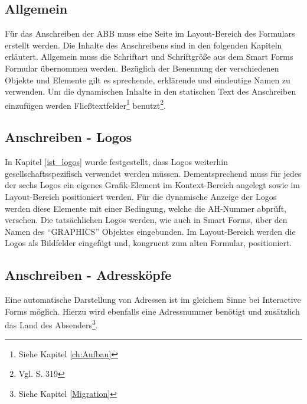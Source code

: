 \subsection{Allgemein}

Für das Anschreiben der ABB muss eine Seite im Layout-Bereich des Formulars erstellt werden. Die Inhalte des Anschreibens sind in den folgenden Kapiteln erläutert. Allgemein muss die Schriftart und Schriftgröße aus dem Smart Forms Formular übernommen werden. Bezüglich der Benennung der verschiedenen Objekte und Elemente gilt es sprechende, erklärende und eindeutige Namen zu verwenden. Um die dynamischen Inhalte in den statischen Text des Anschreiben einzufügen werden Fließtextfelder\footnote{Siehe Kapitel \ref{ch:Aufbau}} benutzt\footnote{Vgl. \cite{Hauser.2015} S. 319}.

\subsection{Anschreiben - Logos}

In Kapitel \ref{ist_logos} wurde festgestellt, dass Logos weiterhin gesellschaftsspezifisch verwendet werden müssen. Dementsprechend muss für jedes der sechs Logos ein eigenes Grafik-Element im Kontext-Bereich angelegt sowie im Layout-Bereich positioniert werden. Für die dynamische Anzeige der Logos werden diese Elemente mit einer Bedingung, welche die \ac{AH}-Nummer abprüft, versehen. Die tatsächlichen Logos werden, wie auch in Smart Forms, über den Namen des "`GRAPHICS"' Objektes eingebunden. Im Layout-Bereich werden die Logos als Bildfelder eingefügt und, kongruent zum alten Formular, positioniert. 

\subsection{Anschreiben - Adressköpfe}

Eine automatische Darstellung von Adressen ist im gleichem Sinne bei Interactive Forms möglich. Hierzu wird ebenfalls eine Adressnummer benötigt und zusätzlich das Land des Absenders\footnote{Siehe Kapitel \ref{Migration}}.


